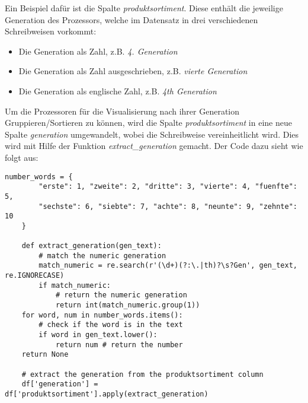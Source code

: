 Ein Beispiel dafür ist die Spalte \textit{produktsortiment}. Diese enthält die jeweilige Generation des Prozessors, welche im Datensatz in drei verschiedenen
Schreibweisen vorkommt:
\begin{itemize}
    \item Die Generation als Zahl, z.B. \textit{4. Generation}
    \item Die Generation als Zahl ausgeschrieben, z.B. \textit{vierte Generation}
    \item Die Generation als englische Zahl, z.B. \textit{4th Generation}
\end{itemize}
Um die Prozessoren für die Visualisierung nach ihrer Generation Gruppieren/Sortieren zu können, wird die Spalte \textit{produktsortiment}
in eine neue Spalte \textit{generation} umgewandelt, wobei die Schreibweise vereinheitlicht wird. Dies wird mit Hilfe der Funktion \textit{extract\_generation}
gemacht. Der Code dazu sieht wie folgt aus:
\begin{lstlisting}[caption={\texttt{Funktion extraxct\_generation}},captionpos=b]
    number_words = {
        "erste": 1, "zweite": 2, "dritte": 3, "vierte": 4, "fuenfte": 5,
        "sechste": 6, "siebte": 7, "achte": 8, "neunte": 9, "zehnte": 10
    }

    def extract_generation(gen_text):
        # match the numeric generation
        match_numeric = re.search(r'(\d+)(?:\.|th)?\s?Gen', gen_text, re.IGNORECASE)
        if match_numeric:
            # return the numeric generation
            return int(match_numeric.group(1))
    for word, num in number_words.items():
        # check if the word is in the text
        if word in gen_text.lower(): 
            return num # return the number
    return None

    # extract the generation from the produktsortiment column
    df['generation'] = df['produktsortiment'].apply(extract_generation) 
\end{lstlisting}

